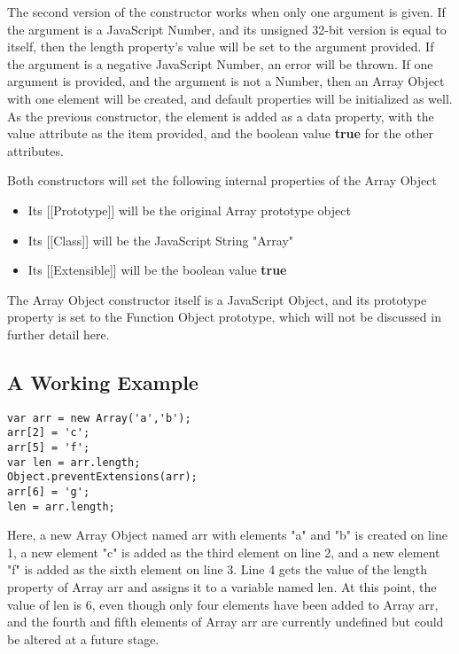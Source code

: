 \documentclass[a4paper,11pt,twoside]{report}
\begin{document}
The second version of the constructor works when only one argument is given. If the argument is a JavaScript Number, and its unsigned 32-bit version is equal to itself, then the length property's value will be set to the argument provided. If the argument is a negative JavaScript Number, an error will be thrown. If one argument is provided, and the argument is not a Number, then an Array Object with one element will be created, and default properties will be initialized as well. As the previous constructor, the element is added as a data property, with the value attribute as the item provided, and the boolean value \textbf{true} for the other attributes. 

Both constructors will set the following internal properties of the Array Object
\begin{itemize}
\item Its [[Prototype]] will be the original Array prototype object
\item Its [[Class]] will be the JavaScript String "Array"
\item Its [[Extensible]] will be the boolean value \textbf{true}
\end{itemize}

The Array Object constructor itself is a JavaScript Object, and its prototype property is set to the Function Object prototype, which will not be discussed in further detail here.

\subsection{A Working Example}
\begin{center}
\begin{minipage}{10cm}
\begin{lstlisting}
var arr = new Array('a','b');
arr[2] = 'c';
arr[5] = 'f';
var len = arr.length;
Object.preventExtensions(arr);
arr[6] = 'g';
len = arr.length;
\end{lstlisting}
\end{minipage}
\end{center}

Here, a new Array Object named arr with elements "a" and "b" is created on line 1, a new element "c" is added as the third element on line 2, and a new element "f" is added as the sixth element on line 3. Line 4 gets the value of the length property of Array arr and assigns it to a variable named len. At this point, the value of len is 6, even though only four elements have been added to Array arr, and the fourth and fifth elements of Array arr are currently undefined but could be altered at a future stage.
\end{document}
